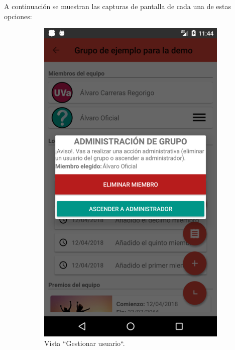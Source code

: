 \documentclass[twoside]{report}
\begin{document}
A continuación se muestran las capturas de pantalla de cada una de estas opciones:
\begin{figure}[H]
\begin{center}
	\begin{subfigure}[t]{.3\linewidth}
		\includegraphics[scale=0.2]{images/userguide/15a.png}
		\caption{Vista “Gestionar usuario“.}
	\end{subfigure}\hspace{2mm}%
	\begin{subfigure}[t]{.3\linewidth}

\end{subfigure}
\end{center}
\end{figure}
\end{document}
